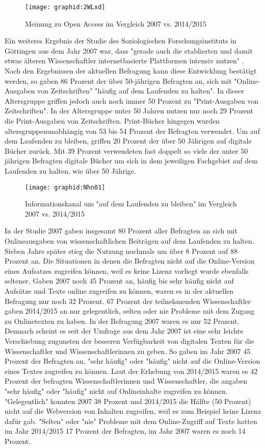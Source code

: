 \begin{figure}[h!]
\texttt{[image: graphid:2WLxd]}
\caption{Meinung zu Open Access im Vergleich 2007 vs. 2014/2015}
\end{figure}

Ein weiteres Ergebnis der Studie des Soziologischen Forschungsinstituts in Göttingen aus dem Jahr 2007 war, dass "gerade auch die etablierten und damit etwas älteren Wissenschaftler internetbasierte Plattformen intensiv nutzen" \cite{hanekop_wittke_2007}. Nach den Ergebnissen der aktuellen Befragung kann diese Entwicklung bestätigt werden, so gaben 86 Prozent der über 50-jährigen Befragten an, sich mit "Online-Ausgaben von Zeitschriften" "häufig auf dem Laufenden zu halten". In dieser Altersgruppe griffen jedoch auch noch immer 50 Prozent zu "Print-Ausgaben von Zeitschriften". In der Altersgruppe unter 50 Jahren nutzen nur noch 29 Prozent die Print-Ausgaben von Zeitschriften. Print-Bücher hingegen wurden altersgruppenunabhängig von 53 bis 54 Prozent der Befragten verwendet. Um auf dem Laufenden zu bleiben, griffen 20 Prozent der über 50 Jährigen auf digitale Bücher zurück. Mit 39 Prozent verwendeten fast doppelt so viele der unter 50 jährigen Befragten digitale Bücher um sich in dem jeweiligen Fachgebiet auf dem Laufenden zu halten, wie über 50 Jährige.

\begin{figure}[h!]
\texttt{[image: graphid:Nhn01]}
\caption{Informationskanal um "auf dem Laufenden zu bleiben" im Vergleich 2007 vs. 2014/2015}
\end{figure}

In der Studie 2007 gaben insgesamt 80 Prozent aller Befragten an sich mit Onlineausgaben von wissenschaftlichen Beiträgen auf dem Laufenden zu halten. Sieben Jahre später stieg die Nutzung nochmals um über 8 Prozent auf 88 Prozent an. Die Situationen in denen die Befragten nicht auf die Online-Version eines Aufsatzes zugreifen können, weil es keine Lizenz vorliegt wurde ebenfalls seltener. Gaben 2007 noch 45 Prozent an, häufig bis sehr häufig nicht auf Aufsätze und Texte online zugreifen zu können, waren es in der aktuellen Befragung nur noch 32 Prozent. 67 Prozent der teilnehmenden Wissenschaftler gaben 2014/2015 an nur gelegentlich, selten oder nie Probleme mit dem Zugang zu Onlinetexten zu haben. In der Befragung 2007 waren es nur 52 Prozent. Demnach scheint es seit der Umfrage aus dem Jahr 2007 ist eine sehr leichte Verschiebung zu­guns­ten der besseren Verfügbarkeit von digitalen Texten für die Wissenschaftler und Wissenschaftlerinnen zu geben. So gaben im Jahr 2007 45 Prozent der Befragten an, "sehr häufig" oder "häufig" nicht auf die Online-Version eines Textes zugreifen zu können. Laut der Erhebung von 2014/2015 waren es 42 Prozent der befragten Wissenschaftlerinnen und Wissenschaftler, die angaben "sehr häufig" oder "häufig" nicht auf Onlineinhalte zugreifen zu können. "Gelegentlich" konnten 2007 38 Prozent und 2014/2015 die Hälfte (50 Prozent) nicht auf die Webversion von Inhalten zugreifen, weil es zum Beispiel keine Lizenz dafür gab. "Selten" oder "nie" Probleme mit dem Online-Zugriff auf Texte hatten im Jahr 2014/2015 17 Prozent der Befragten, im Jahr 2007 waren es noch 14 Prozent.

